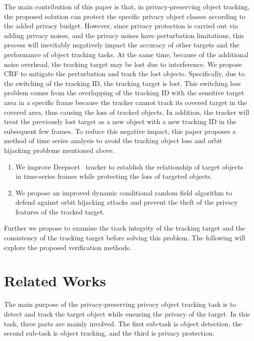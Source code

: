 \documentclass[trans]{IEEEtran}
\newcommand{\el}[1]{{\color{black}#1}}
\begin{document}
The main \el{ contribution of this paper is that, in privacy-preserving object tracking, the proposed solution can protect the specific privacy object classes according to the added privacy budget. However, since privacy protection is carried out via adding privacy noises, and the privacy noises have perturbation limitations,} this process will inevitably negatively impact the accuracy of other targets and the performance of object tracking tasks. At the same time, because of the additional noise overhead, the tracking target may be lost due to interference. \el{ We propose CRF to mitigate} the perturbation and track the lost objects. 
\el{ Specifically, due to the switching of the tracking ID, the tracking target is lost. This switching loss problem comes from the overlapping of the tracking ID with the sensitive target area in a specific frame because the tracker cannot track its covered target in the covered area, thus causing the loss of tracked objects.} In addition, the tracker will treat the previously lost target as a new object with a new tracking ID in the subsequent few frames. To reduce this negative impact, this paper proposes a method of time series analysis to avoid the tracking object loss and orbit hijacking problems mentioned above. 
\el{
\begin{enumerate}
    \item We improve Deepsort~\cite{theagarajan2020automated} tracker to establish the relationship of target objects in time-series frames while protecting the loss of targeted objects.
    \item We propose an improved dynamic conditional random field algorithm to defend against orbit hijacking attacks and prevent the theft of the privacy features of the tracked target.
\end{enumerate}

Further we propose to examine the track integrity of the tracking target and the consistency of the tracking target before solving this problem. The following will explore the proposed verification methods.
}



\section{Related Works}
The main purpose of the privacy-preserving privacy object tracking task is to detect and track the target object while ensuring the privacy of the target. In this task, three parts are mainly involved. The first sub-task is object detection, the second sub-task is object tracking, and the third is privacy protection.
\end{document}
